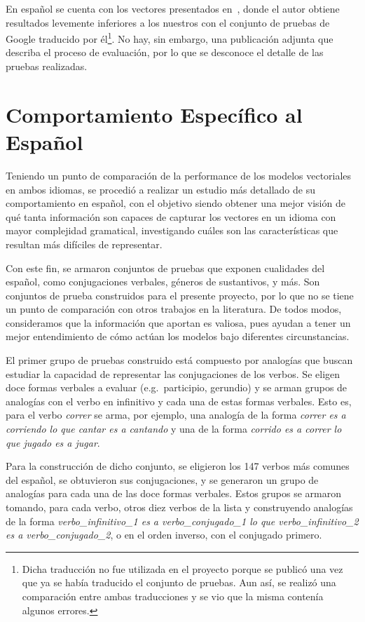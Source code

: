 En español se cuenta con los vectores presentados en~\cite{SBWCE}, donde el autor obtiene resultados
levemente inferiores a los nuestros con el conjunto de pruebas de Google traducido por
él\footnote{Dicha traducción no fue utilizada en el proyecto porque se publicó una vez que ya se
había traducido el conjunto de pruebas. Aun así, se realizó una comparación entre ambas traducciones
y se vio que la misma contenía algunos errores.}. No hay, sin embargo, una publicación adjunta que
describa el proceso de evaluación, por lo que se desconoce el detalle de las pruebas realizadas.


\section{Comportamiento Específico al Español}

Teniendo un punto de comparación de la performance de los modelos vectoriales en ambos idiomas, se
procedió a realizar un estudio más detallado de su comportamiento en español, con el objetivo siendo
obtener una mejor visión de qué tanta información son capaces de capturar los vectores en un idioma
con mayor complejidad gramatical, investigando cuáles son las características que resultan más
difíciles de representar.

Con este fin, se armaron conjuntos de pruebas que exponen cualidades del español, como conjugaciones
verbales, géneros de sustantivos, y más. Son conjuntos de prueba construidos para el presente
proyecto, por lo que no se tiene un punto de comparación con otros trabajos en la literatura. De
todos modos, consideramos que la información que aportan es valiosa, pues ayudan a tener un mejor
entendimiento de cómo actúan los modelos bajo diferentes circunstancias.


El primer grupo de pruebas construido está compuesto por analogías que buscan estudiar la capacidad
de representar las conjugaciones de los verbos. Se eligen doce formas verbales a evaluar
(e.g.\ participio, gerundio) y se arman grupos de analogías con el verbo en infinitivo y cada una de
estas formas verbales. Esto es, para el verbo \textit{correr} se arma, por ejemplo, una analogía de
la forma \textit{correr es a corriendo lo que cantar es a cantando} y una de la forma
\textit{corrido es a correr lo que jugado es a jugar}.

Para la construcción de dicho conjunto, se eligieron los 147 verbos más comunes del español, se
obtuvieron sus conjugaciones, y se generaron un grupo de analogías para cada una de las doce formas
verbales. Estos grupos se armaron tomando, para cada verbo, otros diez verbos de la lista y
construyendo analogías de la forma \textit{verbo\_infinitivo\_1 es a verbo\_conjugado\_1 lo que
verbo\_infinitivo\_2 es a verbo\_conjugado\_2}, o en el orden inverso, con el conjugado primero.

